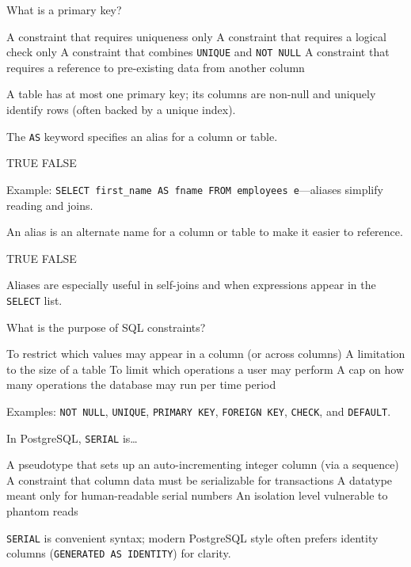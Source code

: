 \question[4]
What is a primary key?
\begin{choices}
  \choice A constraint that requires uniqueness only
  \choice A constraint that requires a logical check only
  \CorrectChoice A constraint that combines \texttt{UNIQUE} and \texttt{NOT NULL}
  \choice A constraint that requires a reference to pre-existing data from another column
\end{choices}
\begin{solution}
  A table has at most one primary key; its columns are non-null and uniquely identify rows (often backed by a unique index).
\end{solution}

\question[4]
The \lstinline[style=sqlinline]!AS! keyword specifies an alias for a column or table.
\begin{choices}
  \CorrectChoice TRUE
  \choice FALSE
\end{choices}
\begin{solution}
  Example: \lstinline[style=sqlinline]!SELECT first_name AS fname FROM employees e!---aliases simplify reading and joins.
\end{solution}

\question[4]
An alias is an alternate name for a column or table to make it easier to reference.
\begin{choices}
  \CorrectChoice TRUE
  \choice FALSE
\end{choices}
\begin{solution}
  Aliases are especially useful in self-joins and when expressions appear in the \texttt{SELECT} list.
\end{solution}

\question[4]
What is the purpose of SQL constraints?
\begin{choices}
  \CorrectChoice To restrict which values may appear in a column (or across columns)
  \choice A limitation to the size of a table
  \choice To limit which operations a user may perform
  \choice A cap on how many operations the database may run per time period
\end{choices}
\begin{solution}
  Examples: \texttt{NOT NULL}, \texttt{UNIQUE}, \texttt{PRIMARY KEY}, \texttt{FOREIGN KEY}, \texttt{CHECK}, and \texttt{DEFAULT}.
\end{solution}

\question[4]
In PostgreSQL, \texttt{SERIAL} is\ldots
\begin{choices}
  \CorrectChoice A pseudotype that sets up an auto-incrementing integer column (via a sequence)
  \choice A constraint that column data must be serializable for transactions
  \choice A datatype meant only for human-readable serial numbers
  \choice An isolation level vulnerable to phantom reads
\end{choices}
\begin{solution}
  \texttt{SERIAL} is convenient syntax; modern PostgreSQL style often prefers identity columns (\texttt{GENERATED AS IDENTITY}) for clarity.
\end{solution}

